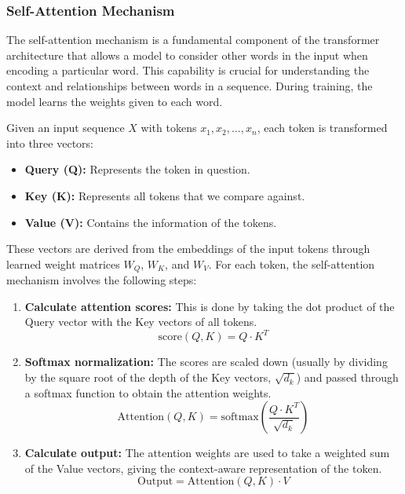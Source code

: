 \subsubsection{Self-Attention Mechanism}

The self-attention mechanism is a fundamental component of the transformer architecture that allows a model to consider other words in the input when encoding a particular word. This capability is crucial for understanding the context and relationships between words in a sequence. During training, the model learns the weights given to each word.

Given an input sequence \( X \) with tokens \( x_1, x_2, \ldots, x_n \), each token is transformed into three vectors:
\begin{itemize}
    \item \textbf{Query (Q):} Represents the token in question.
    \item \textbf{Key (K):} Represents all tokens that we compare against.
    \item \textbf{Value (V):} Contains the information of the tokens.
\end{itemize}

These vectors are derived from the embeddings of the input tokens through learned weight matrices \( W_Q \), \( W_K \), and \( W_V \). For each token, the self-attention mechanism involves the following steps:

\begin{enumerate}
    \item \textbf{Calculate attention scores:} This is done by taking the dot product of the Query vector with the Key vectors of all tokens.
    \begin{equation}
        \text{score}(Q, K) = Q \cdot K^T
    \end{equation}
    
    \item \textbf{Softmax normalization:} The scores are scaled down (usually by dividing by the square root of the depth of the Key vectors, \( \sqrt{d_k} \)) and passed through a softmax function to obtain the attention weights.
    \begin{equation}
        \text{Attention}(Q, K) = \text{softmax}\left(\frac{Q \cdot K^T}{\sqrt{d_k}}\right)
    \end{equation}
    
    \item \textbf{Calculate output:} The attention weights are used to take a weighted sum of the Value vectors, giving the context-aware representation of the token.
    \begin{equation}
        \text{Output} = \text{Attention}(Q, K) \cdot V
    \end{equation}
\end{enumerate}

